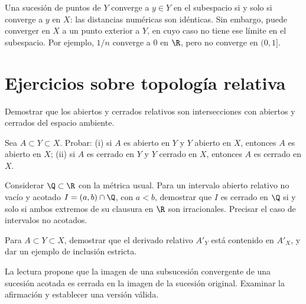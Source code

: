 \begin{observacion}\label{ch04:convergencia}
Una sucesión de puntos de $Y$ converge a $y\in Y$ en el subespacio si y solo si converge a $y$ en $X$: las distancias numéricas son idénticas. Sin embargo, puede converger en $X$ a un punto exterior a $Y$, en cuyo caso no tiene ese límite en el subespacio. Por ejemplo, $1/n$ converge a $0$ en $\R$, pero no converge en $(0,1]$.
\end{observacion}

\section{Ejercicios sobre topología relativa}
\begin{ejercicio}\label{ej:lectura-4-1}
Demostrar que los abiertos y cerrados relativos son intersecciones con abiertos y cerrados del espacio ambiente.
\end{ejercicio}


\begin{ejercicio}\label{ej:lectura-4-2}
Sea $A\subset Y\subset X$. Probar: (i) si $A$ es abierto en $Y$ y $Y$ abierto en $X$, entonces $A$ es abierto en $X$; (ii) si $A$ es cerrado en $Y$ y $Y$ cerrado en $X$, entonces $A$ es cerrado en $X$.
\end{ejercicio}


\begin{ejercicio}\label{ej:lectura-4-3}
Considerar $\Q\subset\R$ con la métrica usual. Para un intervalo abierto relativo no vacío y acotado $I=(a,b)\cap\Q$, con $a<b$, demostrar que $I$ es cerrado en $\Q$ si y solo si ambos extremos de su clausura en $\R$ son irracionales. Precisar el caso de intervalos no acotados.
\end{ejercicio}


\begin{ejercicio}\label{ej:lectura-4-4}
Para $A\subset Y\subset X$, demostrar que el derivado relativo $A'_Y$ está contenido en $A'_X$, y dar un ejemplo de inclusión estricta.
\end{ejercicio}


\begin{ejercicio}\label{ej:lectura-4-5}
La lectura propone que la imagen de una subsucesión convergente de una sucesión acotada es cerrada en la imagen de la sucesión original. Examinar la afirmación y establecer una versión válida.
\end{ejercicio}


